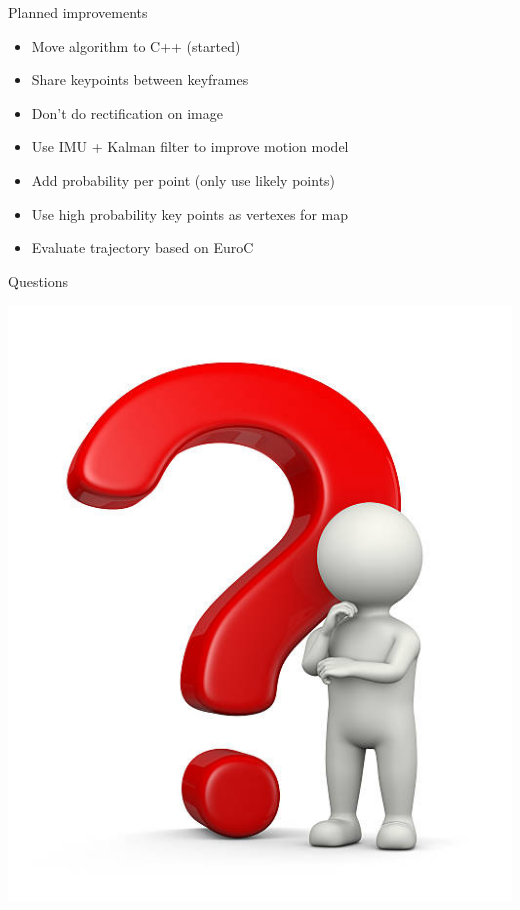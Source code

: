 \documentclass[aspectratio=169]{beamer}
\begin{document}
\begin{frame}{Planned improvements}
\begin{itemize}
  \item Move algorithm to C++ (started)
  \item Share keypoints between keyframes 
  \item Don't do rectification on image
  \item Use IMU + Kalman filter to improve motion model
  \item Add probability per point (only use likely points)
  \item Use high probability key points as vertexes for map
  \item Evaluate trajectory based on EuroC
\end{itemize}
\end{frame}


\begin{frame}{Questions}
  \begin{center}
    \includegraphics[height=0.9\textheight]{./img/question.jpg}
  \end{center}
\end{frame}
\end{document}
